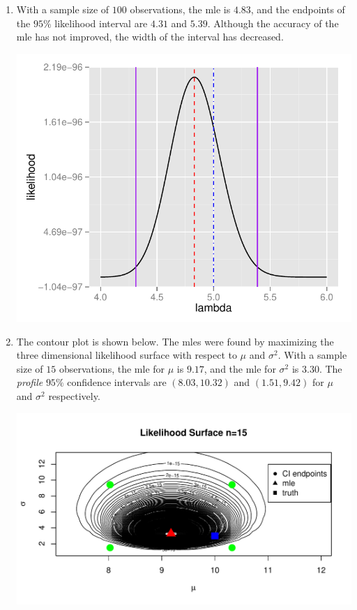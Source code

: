 \documentclass[12pt]{article}\usepackage[]{graphicx}\usepackage[]{color}
\newenvironment{knitrout}{}{} %
\begin{document}
\begin{doublespacing}
\begin{enumerate}
\begin{enumerate}
\begin{knitrout}
\end{knitrout}


\item With a sample size of $100$ observations, the mle is $4.83$, and the endpoints of the $95\%$ likelihood interval are $4.31$ and $5.39$. Although the accuracy of the mle has not improved, the width of the interval has decreased.

\begin{knitrout}\footnotesize
{}\color{fgcolor}
\includegraphics[width=.5\linewidth]{figure/poisson100-1} 

\end{knitrout}

\item The contour plot is shown below. The mles were found by maximizing the three dimensional likelihood surface with respect to $\mu$ and $\sigma^2$. With a sample size of $15$ observations, the mle for $\mu$ is $9.17$, and the mle for $\sigma^2$ is $3.30$. The {\it profile} $95\%$ confidence intervals are $(8.03, 10.32)$ and $(1.51, 9.42)$ for $\mu$ and $\sigma^2$ respectively.

\begin{knitrout}\footnotesize
{}\color{fgcolor}
\includegraphics[width=0.8\linewidth]{figure/normal15-1} 

\end{knitrout}


\end{enumerate}
\end{enumerate}
\end{doublespacing}
\end{document}
